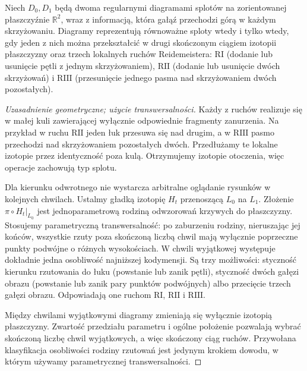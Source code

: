 \begin{twierdzenie}[Reidemeister]
Niech $D_0,D_1$ będą dwoma regularnymi diagramami splotów
na zorientowanej płaszczyźnie $\mathbb R^2$, wraz z informacją,
która gałąź przechodzi górą w każdym skrzyżowaniu. Diagramy reprezentują równoważne sploty wtedy
i tylko wtedy, gdy jeden z nich można przekształcić w drugi
skończonym ciągiem izotopii płaszczyzny oraz trzech lokalnych
ruchów Reidemeistera: $\mathrm{R I}$ (dodanie lub usunięcie
pętli z jednym skrzyżowaniem), $\mathrm{R II}$ (dodanie lub
usunięcie dwóch skrzyżowań) i $\mathrm{R III}$ (przesunięcie
jednego pasma nad skrzyżowaniem dwóch pozostałych).
\end{twierdzenie}

\begin{proof}[Uzasadnienie geometryczne; użycie transwersalności]
Każdy z ruchów realizuje się w małej kuli zawierającej wyłącznie
odpowiednie fragmenty zanurzenia. Na przykład w ruchu $\mathrm{R II}$
jeden łuk przesuwa się nad drugim, a w $\mathrm{R III}$ pasmo
przechodzi nad skrzyżowaniem pozostałych dwóch. Przedłużamy
te lokalne izotopie przez identyczność poza kulą. Otrzymujemy
izotopie otoczenia, więc operacje zachowują typ splotu.

Dla kierunku odwrotnego nie wystarcza arbitralne oglądanie
rysunków w kolejnych chwilach. Ustalmy gładką izotopię
$H_t$ przenoszącą $L_0$ na $L_1$. Złożenie
$\pi\circ H_t|_{L_0}$ jest jednoparametrową rodziną
odwzorowań krzywych do płaszczyzny. Stosujemy parametryczną
transwersalność: po zaburzeniu rodziny, nieruszając jej
końców, wszystkie rzuty poza skończoną liczbą chwil mają
wyłącznie poprzeczne punkty podwójne o różnych wysokościach.
W chwili wyjątkowej występuje dokładnie jedna osobliwość
najniższej kodymensji. Są trzy możliwości: styczność kierunku
rzutowania do łuku (powstanie lub zanik pętli), styczność
dwóch gałęzi obrazu (powstanie lub zanik pary punktów
podwójnych) albo przecięcie trzech gałęzi obrazu. Odpowiadają
one ruchom $\mathrm{R I}$, $\mathrm{R II}$ i $\mathrm{R III}$.

Między chwilami wyjątkowymi diagramy zmieniają się wyłącznie
izotopią płaszczyzny. Zwartość przedziału parametru i ogólne
położenie pozwalają wybrać skończoną liczbę chwil wyjątkowych,
a więc skończony ciąg ruchów. Przywołana klasyfikacja
osobliwości rodziny rzutowań jest jedynym krokiem dowodu,
w którym używamy parametrycznej transwersalności.
\end{proof}


